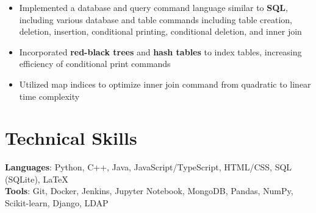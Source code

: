 \documentclass[letterpaper,11pt]{article}
\begin{document}
\begin{itemize}
    \item Implemented a database and query command language similar to \textbf{SQL},
          including various database and table commands including table creation,
          deletion, insertion, conditional printing, conditional deletion, and inner join
    \item Incorporated \textbf{red-black trees} and \textbf{hash tables} to index tables,
          increasing efficiency of conditional print commands
    \item Utilized map indices to optimize inner join command from quadratic to linear
          time complexity
\end{itemize}
\section{Technical Skills}
\textbf{Languages}: Python, C++, Java, JavaScript/TypeScript, HTML/CSS, SQL
(SQLite), \LaTeX \\
\textbf{Tools}: Git, Docker, Jenkins, Jupyter Notebook,
MongoDB, Pandas, NumPy, Scikit-learn, Django, LDAP
\end{document}
